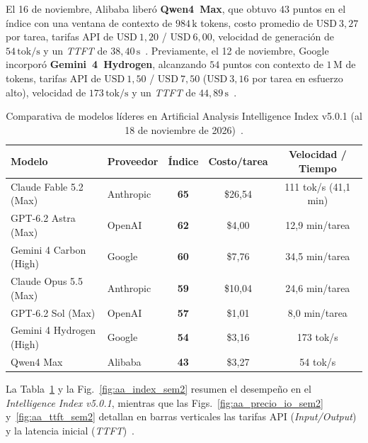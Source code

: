 \documentclass[conference,twocolumn,spanish]{IEEEtran}
\begin{document}
El 16 de noviembre, Alibaba liberó \textbf{Qwen4~Max}, que obtuvo $43$ puntos en el índice con una ventana de contexto de $984\,\text{k}$ tokens, costo promedio de $\text{USD}~3{,}27$ por tarea, tarifas API de $\text{USD}~1{,}20$ / $\text{USD}~6{,}00$, velocidad de generación de $54\,\text{tok/s}$ y un \textit{TTFT} de $38{,}40\,\text{s}$~\cite{aa_index_2026,alibaba_qwen4_2026}. Previamente, el 12 de noviembre, Google incorporó \textbf{Gemini~4~Hydrogen}, alcanzando $54$ puntos con contexto de $1\,\text{M}$ de tokens, tarifas API de $\text{USD}~1{,}50$ / $\text{USD}~7{,}50$ ($\text{USD}~3{,}16$ por tarea en esfuerzo alto), velocidad de $173\,\text{tok/s}$ y un \textit{TTFT} de $44{,}89\,\text{s}$~\cite{aa_index_2026,google_gemini4_hydrogen_2026}.

\begin{table}[htbp]
\centering
\caption{Comparativa de modelos líderes en Artificial Analysis Intelligence Index v5.0.1 (al 18 de noviembre de 2026)~\cite{aa_index_2026}.}
\label{tab:aa_modelos_sem2}
\scriptsize
\begin{tabularx}{\columnwidth}{@{}l l c c c@{}}
\toprule
\textbf{Modelo} & \textbf{Proveedor} & \textbf{Índice} & \textbf{Costo/tarea} & \textbf{Velocidad / Tiempo} \\
\midrule
Claude Fable 5.2 (Max)   & Anthropic & \textbf{65} & \$26,54 & 111 tok/s (41,1 min) \\
GPT-6.2 Astra (Max)      & OpenAI    & \textbf{62} & \$4,00  & 12,9 min/tarea \\
Gemini 4 Carbon (High)   & Google    & \textbf{60} & \$7,76  & 34,5 min/tarea \\
Claude Opus 5.5 (Max)    & Anthropic & \textbf{59} & \$10,04 & 24,6 min/tarea \\
GPT-6.2 Sol (Max)        & OpenAI    & \textbf{57} & \$1,01  & 8,0 min/tarea \\
Gemini 4 Hydrogen (High) & Google    & \textbf{54} & \$3,16  & 173 tok/s \\
Qwen4 Max                & Alibaba   & \textbf{43} & \$3,27  & 54 tok/s \\
\bottomrule
\end{tabularx}
\end{table}

La Tabla~\ref{tab:aa_modelos_sem2} y la Fig.~\ref{fig:aa_index_sem2} resumen el desempeño en el \textit{Intelligence Index v5.0.1}, mientras que las Figs.~\ref{fig:aa_precio_io_sem2} y~\ref{fig:aa_ttft_sem2} detallan en barras verticales las tarifas API (\textit{Input/Output}) y la latencia inicial (\textit{TTFT})~\cite{aa_index_2026}.
\end{document}
